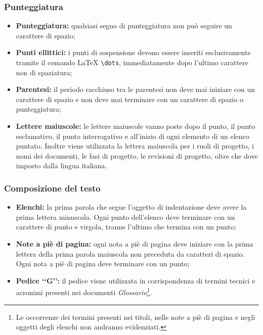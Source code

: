 \subsubsection{Punteggiatura}
\label{punteggiatura}
\begin{itemize}
\item \textbf{Punteggiatura:} qualsiasi segno di punteggiatura non può seguire un carattere di spazio;
\item \textbf{Punti ellittici:} i punti di sospensione devono essere inseriti esclusivamente tramite il comando \LaTeX{} \verb!\dots!, immediatamente dopo l'ultimo carattere non di spaziatura;
\item \textbf{Parentesi:} il periodo racchiuso tra le parentesi non deve mai iniziare con un carattere di spazio e non deve mai terminare con un carattere di spazio o punteggiatura;
\item \textbf{Lettere maiuscole:} le lettere maiuscole vanno poste dopo il punto, il punto esclamativo, il punto interrogativo e all'inizio di ogni elemento di un elenco puntato. Inoltre viene utilizzata la lettera maiuscola per i ruoli di progetto, i nomi dei documenti, le fasi di progetto, le revisioni di progetto, oltre che dove imposto dalla lingua italiana.
\end{itemize}

\subsubsection{Composizione del testo}
\label{composizione del testo}
\begin{itemize}
\item \textbf{Elenchi:} la prima parola che segue l'oggetto di indentazione deve avere la prima lettera minuscola. Ogni punto dell'elenco deve terminare con un carattere di punto e virgola, tranne l'ultimo che termina con un punto;
\item \textbf{Note a piè di pagina:} ogni nota a piè di pagina deve iniziare con la prima lettera della prima parola maiuscola non preceduta da caratteri di spazio. Ogni nota a piè di pagina deve terminare con un punto;
\item \textbf{Pedice \lq\lq{}G\rq\rq{}:} il pedice\glossario{} viene utilizzata in corrispondenza di termini tecnici e acronimi presenti nei documenti \emph{Glossario}\footnote{Le occorrenze dei termini presenti nei titoli, nelle note a piè di pagina e negli oggetti degli elenchi non andranno evidenziati.}. 
\end{itemize}

